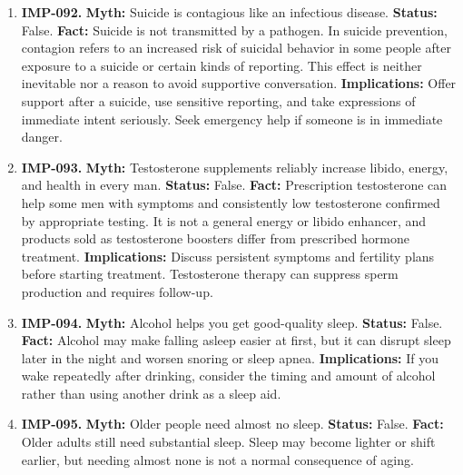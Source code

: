 \documentclass[11pt,oneside]{book}
\begin{document}
\begin{enumerate}[leftmargin=0pt,labelwidth=0pt,labelsep=0pt,itemindent=0pt]
\item[] \textbf{IMP-092.} \textbf{Myth:} Suicide is contagious like an infectious disease.\newline
\textbf{Status:} False.\newline
\textbf{Fact:} Suicide is not transmitted by a pathogen. In suicide prevention, contagion refers to an increased risk of suicidal behavior in some people after exposure to a suicide or certain kinds of reporting. This effect is neither inevitable nor a reason to avoid supportive conversation. \cite{ref430}\newline
\textbf{Implications:} Offer support after a suicide, use sensitive reporting, and take expressions of immediate intent seriously. Seek emergency help if someone is in immediate danger.
\item[] \textbf{IMP-093.} \textbf{Myth:} Testosterone supplements reliably increase libido, energy, and health in every man.\newline
\textbf{Status:} False.\newline
\textbf{Fact:} Prescription testosterone can help some men with symptoms and consistently low testosterone confirmed by appropriate testing. It is not a general energy or libido enhancer, and products sold as testosterone boosters differ from prescribed hormone treatment. \cite{ref431}\newline
\textbf{Implications:} Discuss persistent symptoms and fertility plans before starting treatment. Testosterone therapy can suppress sperm production and requires follow-up.
\item[] \textbf{IMP-094.} \textbf{Myth:} Alcohol helps you get good-quality sleep.\newline
\textbf{Status:} False.\newline
\textbf{Fact:} Alcohol may make falling asleep easier at first, but it can disrupt sleep later in the night and worsen snoring or sleep apnea. \cite{ref432}\newline
\textbf{Implications:} If you wake repeatedly after drinking, consider the timing and amount of alcohol rather than using another drink as a sleep aid.
\item[] \textbf{IMP-095.} \textbf{Myth:} Older people need almost no sleep.\newline
\textbf{Status:} False.\newline
\textbf{Fact:} Older adults still need substantial sleep. Sleep may become lighter or shift earlier, but needing almost none is not a normal consequence of aging. \cite{ref385}\newline

\end{enumerate}
\end{document}
